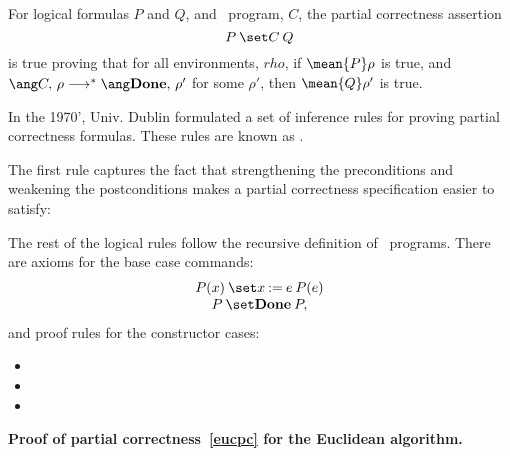 \begin{definition}\label{def_afterPCQ}
For logical formulas $P$ and $Q$, and \while\ program, $C$, the partial correctness assertion
\[
\after{P}{C}{Q}
\]
is true proving that for all environments, $rho$, if $\mean{P}\rho$ is
true, and $\haltswith{C}{\rho}{\rho'}$ for some $\rho'$, then
$\mean{Q}\rho'$ is true.
\end{definition}

In the 1970', %
Univ. Dublin formulated a set of inference rules for proving partial
correctness formulas.  These rules are known as .

The first rule captures the fact that strengthening the preconditions
and weakening the postconditions makes a partial correctness
specification easier to satisfy:


The rest of the logical rules follow the recursive definition of \while\ programs.
There are axioms for the base case commands:
\[\begin{array}{c}
  \after{P(x)}{x \assigned e}{P(e)}\\
  \after{P}{\halt}{P},
\end{array}\]
and proof rules for the constructor cases:

\begin{itemize}

\item
{}

\item
{}
        {}

\item
{}
     {}
\end{itemize}

\begin{example}
\textbf{Proof of partial correctness~\eqref{eucpc} for the Euclidean algorithm.}
\end{example}


\endinput
